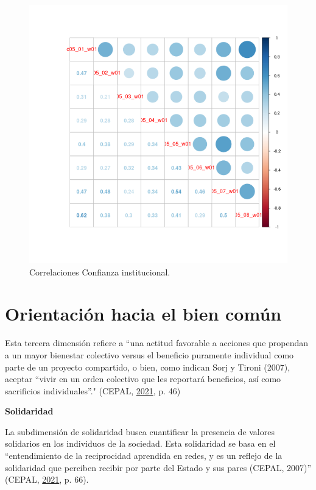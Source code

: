 \documentclass[
  12pt,
]{book}
\begin{document}
\begin{figure}[H]

{\centering \includegraphics[width=1\linewidth,height=1\textheight]{output/graphs/confianza-institucional_cor} 

}

\caption{Correlaciones Confianza institucional.}\label{fig:confianza-institucional-cor}
\end{figure}

\hypertarget{orientaciuxf3n-hacia-el-bien-comuxfan}{%
\section{Orientación hacia el bien común}\label{orientaciuxf3n-hacia-el-bien-comuxfan}}

Esta tercera dimensión refiere a ``una actitud favorable a acciones que propendan a un mayor bienestar colectivo versus el beneficio puramente individual como parte de un proyecto compartido, o bien, como indican Sorj y Tironi (2007), aceptar ``vivir en un orden colectivo que les reportará beneficios, así como sacrificios individuales''." (CEPAL, \protect\hyperlink{ref-cepal_Cohesion_2021}{2021}, p. 46)

\textbf{Solidaridad}

La subdimensión de solidaridad busca cuantificar la presencia de valores solidarios en los individuos de la sociedad. Esta solidaridad se basa en el ``entendimiento de la reciprocidad aprendida en redes, y es un reflejo de la solidaridad que perciben recibir por parte del Estado y sus pares (CEPAL, 2007)'' (CEPAL, \protect\hyperlink{ref-cepal_Cohesion_2021}{2021}, p. 66).
\end{document}
